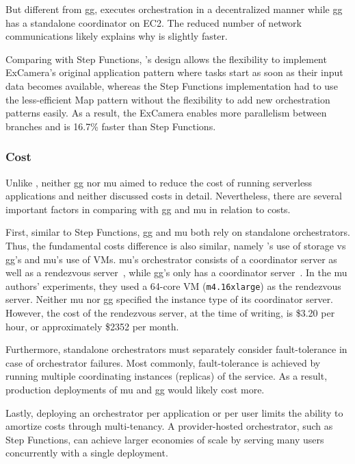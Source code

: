 But different from gg, \name{} executes orchestration in a decentralized
manner while gg has a standalone coordinator on EC2. The reduced number of
network communications likely explains why \name{} is slightly faster.

Comparing with Step Functions, \name{}'s design allows the flexibility to
implement ExCamera's original application pattern where tasks start as soon as
their input data becomes available, whereas the Step Functions implementation
had to use the less-efficient Map pattern without the flexibility to add new
orchestration patterns easily. As a result, the \name{} ExCamera enables more
parallelism between branches and is 16.7\% faster than Step Functions.

\subsubsection{Cost}

Unlike \name{}, neither gg nor mu aimed to reduce the cost of running
serverless applications and neither discussed costs in detail. Nevertheless,
there are several important factors in comparing \name{} with gg and mu in
relation to costs.

First, similar to Step Functions, gg and mu both rely on standalone
orchestrators. Thus, the fundamental costs difference is also similar, namely
\name{}'s use of storage vs gg's and mu's use of VMs. mu's orchestrator
consists of a coordinator server as well as a rendezvous
server~\cite{excamera}, while gg's only has a coordinator
server~\cite{gg-atc}. In the mu authors' experiments, they used a 64-core VM
(\texttt{m4.16xlarge}) as the rendezvous server. Neither mu nor gg specified
the instance type of its coordinator server. However, the cost of the
rendezvous server, at the time of writing, is \$3.20 per hour, or
approximately \$2352 per month.

Furthermore, standalone orchestrators must separately consider fault-tolerance
in case of orchestrator failures. Most commonly, fault-tolerance is achieved
by running multiple coordinating instances (replicas) of the service. As a
result, production deployments of mu and gg would likely cost more.

Lastly, deploying an orchestrator per application or per user limits the
ability to amortize costs through multi-tenancy. A provider-hosted
orchestrator, such as Step Functions, can achieve larger economies of scale by
serving many users concurrently with a single deployment.



